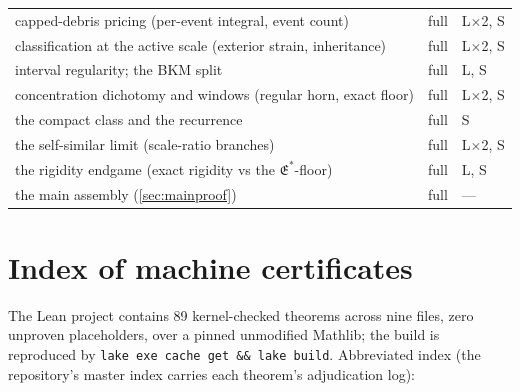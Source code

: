 \documentclass[11pt,letterpaper]{amsart}
\theoremstyle{definition}
\theoremstyle{remark}
\begin{document}
{\begin{longtable}{@{}>{\raggedright\arraybackslash}p{}ll@{}}
capped-debris pricing (per-event integral, event count) & full & L$\times$2, S \\
classification at the active scale (exterior strain, inheritance) & full & L$\times$2, S \\
interval regularity; the BKM split & full & L, S \\
concentration dichotomy and windows (regular horn, exact floor) & full & L$\times$2, S \\
the compact class and the recurrence & full & S \\
the self-similar limit (scale-ratio branches) & full & L$\times$2, S \\
the rigidity endgame (exact rigidity vs the $\mathfrak{E}^*$-floor) & full & L, S \\
the main assembly (\cref{sec:mainproof}) & full & --- \\
\bottomrule
\end{longtable}}

\section{Index of machine certificates}\label{app:certificates}

The Lean project contains 89 kernel-checked theorems across nine files, zero
unproven placeholders, over a pinned unmodified Mathlib; the build is reproduced by
\texttt{lake exe cache get \&\& lake build}. Abbreviated index (the repository's
master index carries each theorem's adjudication log):
\end{document}
